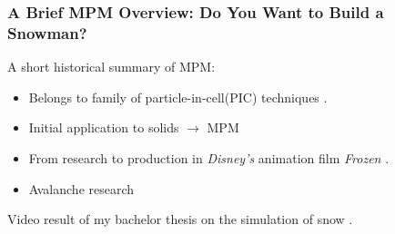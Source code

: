\documentclass{beamer}
\let\oldcite=\cite
\renewcommand{\cite}[1]{\textcolor[rgb]{.55,.55,.89}{\oldcite{#1}}}
\begin{document}
\begin{frame}

\frametitle{A Brief MPM Overview: Do You Want to Build a Snowman?}
A short historical summary of MPM:
\vfill
\begin{minipage}{0.43\paperwidth}
  \begin{itemize}
    \item Belongs to family of particle-in-cell(PIC) techniques \cite{evans1957particle}.
    \item Initial application to solids \cite{sulsky1995application} $\rightarrow$ MPM
    \item From research to production in \textit{Disney's} animation film \textit{Frozen} \cite{MPM:SNOW}.
    \item Avalanche research \cite{MPM:AVALANCHE}
  \end{itemize}
\end{minipage}
\begin{minipage}{0.35\paperwidth}
  \tiny{Video result of my bachelor thesis on the simulation of snow \cite{Meyer2015}.}
\end{minipage}
\end{frame}
\end{document}

